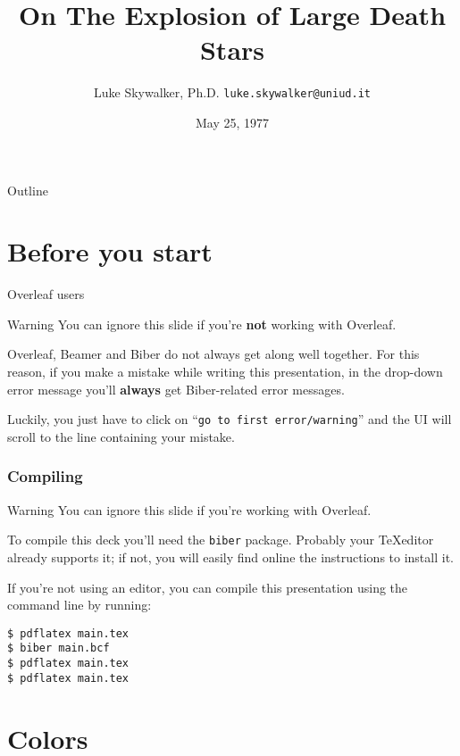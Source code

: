 \documentclass[usenames,dvipsnames]{beamer}
\title[University of Udine Unofficial Beamer Theme]{On The Explosion of Large Death Stars}
\date[May 1977]{May 25, 1977}
\author[Luke Skywalker]{
  Luke Skywalker, Ph.D.
  \pdfnewline
  \texttt{luke.skywalker@uniud.it}
}
\institute{Department of Physics, University of Udine}
\begin{document}
\begin{frame}
\titlepage
\end{frame}

\begin{frame}{Outline}
\tableofcontents
\end{frame}

\section{Before you start}
\begin{frame}{Overleaf users}

\begin{alertblock}{Warning}
You can ignore this slide if you're \textbf{not} working with Overleaf.
\end{alertblock}

\vskip 0.5cm

Overleaf, Beamer and Biber do not always get along well together. For this reason, if you make a mistake while writing this presentation, in the drop-down error message you'll \textbf{always} get Biber-related error messages.

\vskip 0.5cm

Luckily, you just have to click on ``\texttt{go to first error/warning}'' and the UI will scroll to the line containing your mistake.

\end{frame}

\begin{frame}[fragile]
\frametitle{Compiling}

\begin{alertblock}{Warning}
You can ignore this slide if you're working with Overleaf.
\end{alertblock}

To compile this deck you'll need the \texttt{biber} package. Probably your \TeX editor already supports it; if not, you will easily find online the instructions to install it.

\vskip 0.5cm

If you're not using an editor, you can compile this presentation using the command line by running:

\begin{verbatim}
$ pdflatex main.tex
$ biber main.bcf
$ pdflatex main.tex
$ pdflatex main.tex
\end{verbatim}


\end{frame}

\section{Colors}
\end{document}
